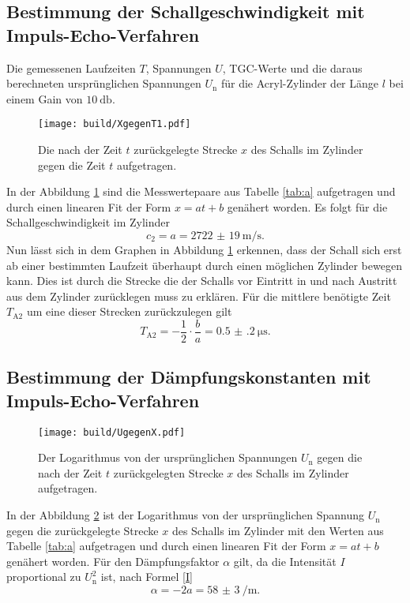 \subsection{Bestimmung der Schallgeschwindigkeit mit Impuls-Echo-Verfahren}
\begin{table}
	\centering
	\caption{Die gemessenen Laufzeiten $T$, Spannungen $U$, TGC-Werte und die daraus berechneten ursprünglichen Spannungen $U_\text{n}$ für die Acryl-Zylinder der Länge $l$ bei einem Gain von $\SI{10}{\decibel}$.}
	
\end{table}
\begin{figure}
	\centering
	\caption{Die nach der Zeit $t$ zurückgelegte Strecke $x$ des Schalls im Zylinder gegen die Zeit $t$ aufgetragen.}
	\texttt{[image: build/XgegenT1.pdf]}
	\label{fig:XgegenT1}
\end{figure}
In der Abbildung \ref{fig:XgegenT1} sind die Messwertepaare aus Tabelle \ref{tab:a} aufgetragen und durch einen linearen Fit der Form $x=a t + b$ genähert worden.
Es folgt für die Schallgeschwindigkeit im Zylinder
\begin{equation}
	c_2=a=\SI{2722(19)}{\meter\per\second}\text{.}
\end{equation}
Nun lässt sich in dem Graphen in Abbildung \ref{fig:XgegenT1} erkennen, dass der Schall sich erst ab einer bestimmten Laufzeit überhaupt durch einen möglichen Zylinder bewegen kann. Dies ist durch die Strecke die der Schalls vor Eintritt in und nach Austritt aus dem Zylinder zurücklegen muss zu erklären. Für die mittlere benötigte Zeit $T_{\text{A}2}$ um eine dieser Strecken zurückzulegen gilt 
\begin{equation}
	T_{\text{A}2}=-\frac{1}{2} \cdot \frac{b}{a}=\SI{0.5(2)}{\micro\second}\text{.}
\end{equation}

\subsection{Bestimmung der Dämpfungskonstanten mit Impuls-Echo-Verfahren}
\begin{figure}
	\centering
	\caption{Der Logarithmus von der ursprünglichen Spannungen $U_\text{n}$ gegen die nach der Zeit $t$ zurückgelegten Strecke $x$ des Schalls im Zylinder aufgetragen.}
	\texttt{[image: build/UgegenX.pdf]}
	\label{fig:UgegenX}
\end{figure}
In der Abbildung \ref{fig:UgegenX} ist der Logarithmus von der ursprünglichen Spannung $U_\text{n}$ gegen die zurückgelegte Strecke $x$ des Schalls im Zylinder mit den Werten aus Tabelle \ref{tab:a} aufgetragen und durch einen linearen Fit der Form $x=a t + b$ genähert worden. Für den Dämpfungsfaktor $\alpha$ gilt, da die Intensität $I$ proportional zu $U_\text{n}^2$ ist, nach Formel \eqref{I}
\begin{equation}
	\alpha=-2 a = \SI{58(3)}{\per\meter}\text{.}
\end{equation}



